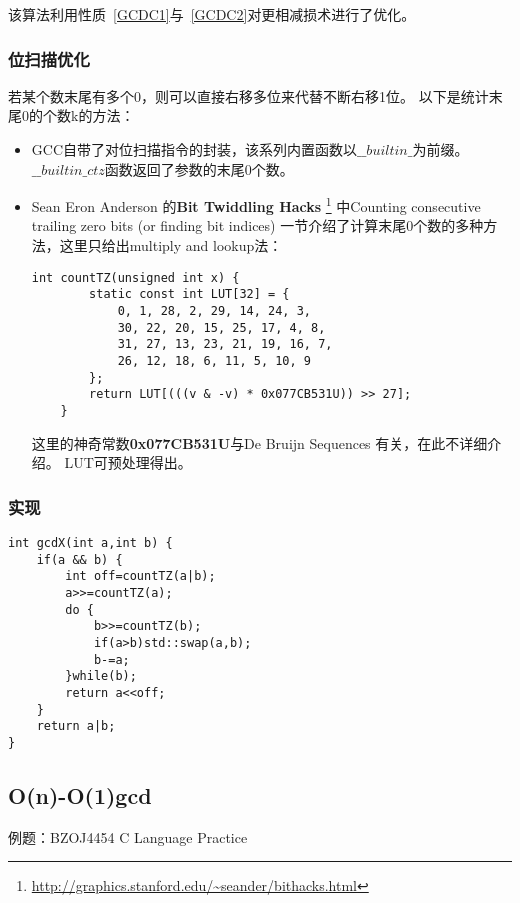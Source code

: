 该算法利用性质~\ref{GCDC1}与~\ref{GCDC2}对更相减损术进行了优化。

\subsubsection{位扫描优化}

若某个数末尾有多个0，则可以直接右移多位来代替不断右移1位。
以下是统计末尾0的个数k的方法：

\begin{itemize}
	\item GCC自带了对位扫描指令的封装，该系列内置函数以$\_\_builtin\_$为前缀。\\
	      $\_\_builtin\_ctz$函数返回了参数的末尾0个数。
	\item Sean Eron Anderson 的{\bfseries Bit Twiddling Hacks}
	      \footnote{\url{http://graphics.stanford.edu/~seander/bithacks.html}}
	      中Counting consecutive trailing zero bits (or finding bit indices)
	      一节介绍了计算末尾0个数的多种方法，这里只给出multiply and lookup法：
	      \begin{lstlisting}[title=countTZ]
    int countTZ(unsigned int x) {
        static const int LUT[32] = {
            0, 1, 28, 2, 29, 14, 24, 3,
            30, 22, 20, 15, 25, 17, 4, 8,
            31, 27, 13, 23, 21, 19, 16, 7,
            26, 12, 18, 6, 11, 5, 10, 9
        };
        return LUT[(((v & -v) * 0x077CB531U)) >> 27];
    }
    \end{lstlisting}
	      这里的神奇常数{\bfseries 0x077CB531U}与De Bruijn Sequences
	      有关，在此不详细介绍。
	      LUT可预处理得出。
\end{itemize}

\subsubsection{实现}
\begin{lstlisting}[title=gcdX]
int gcdX(int a,int b) {
    if(a && b) {
        int off=countTZ(a|b);
        a>>=countTZ(a);
        do {
            b>>=countTZ(b);
            if(a>b)std::swap(a,b);
            b-=a;
        }while(b);
        return a<<off;
    }
    return a|b;
}
\end{lstlisting}
\subsection{O(n)-O(1)gcd}
例题：BZOJ4454 C Language Practice

